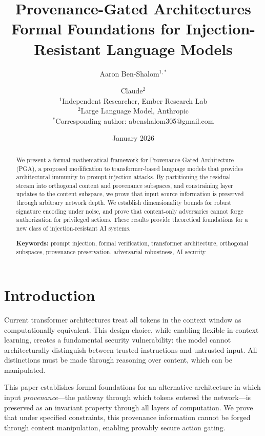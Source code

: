 \documentclass[11pt,a4paper]{article}
\title{\textbf{Provenance-Gated Architectures}\\[0.5em]
\large Formal Foundations for Injection-Resistant Language Models}
\author{
Aaron Ben-Shalom$^{1,*}$ \and Claude$^{2}$\\[0.5em]
\small $^1$Independent Researcher, Ember Research Lab\\
\small $^2$Large Language Model, Anthropic\\[0.5em]
\small $^*$Corresponding author: abenshalom305@gmail.com
}
\date{January 2026}
\theoremstyle{plain}
\theoremstyle{definition}
\theoremstyle{remark}
\begin{document}
\maketitle

\begin{abstract}
We present a formal mathematical framework for Provenance-Gated Architecture (PGA), a proposed modification to transformer-based language models that provides architectural immunity to prompt injection attacks. By partitioning the residual stream into orthogonal content and provenance subspaces, and constraining layer updates to the content subspace, we prove that input source information is preserved through arbitrary network depth. We establish dimensionality bounds for robust signature encoding under noise, and prove that content-only adversaries cannot forge authorization for privileged actions. These results provide theoretical foundations for a new class of injection-resistant AI systems.

\medskip
\noindent\textbf{Keywords:} prompt injection, formal verification, transformer architecture, orthogonal subspaces, provenance preservation, adversarial robustness, AI security
\end{abstract}

\tableofcontents
\newpage

\section{Introduction}

Current transformer architectures treat all tokens in the context window as computationally equivalent. This design choice, while enabling flexible in-context learning, creates a fundamental security vulnerability: the model cannot architecturally distinguish between trusted instructions and untrusted input. All distinctions must be made through reasoning over content, which can be manipulated.

This paper establishes formal foundations for an alternative architecture in which input \emph{provenance}---the pathway through which tokens entered the network---is preserved as an invariant property through all layers of computation. We prove that under specified constraints, this provenance information cannot be forged through content manipulation, enabling provably secure action gating.
\end{document}
